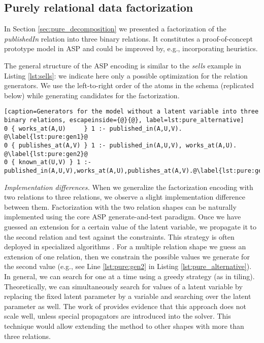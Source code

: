 \subsection{Purely relational data factorization}
In Section \ref{sec:pure_decomposition} we presented a factorization of the \emph{publishedIn} relation into three binary relations. It constitutes a proof-of-concept prototype model in ASP and could be improved by, e.g., incorporating heuristics. %

The general structure of the ASP encoding is similar to the \emph{sells} example in Listing \ref{lst:sells}: we indicate here only a possible optimization for the relation generators.  We use the left-to-right order of the atoms in the schema (replicated below) while generating candidates for the factorization.

\begin{lstlisting}[caption=Generators for the model without a latent variable into three binary relations, escapeinside={@}{@}, label=lst:pure_alternative] 
0 { works_at(A,U)     } 1 :- published_in(A,U,V). @\label{lst:pure:gen1}@
0 { publishes_at(A,V) } 1 :- published_in(A,U,V), works_at(A,U). @\label{lst:pure:gen2}@
0 { known_at(U,V) } 1 :- published_in(A,U,V),works_at(A,U),publishes_at(A,V).@\label{lst:pure:gen3}@
\end{lstlisting}


\textit{Implementation differences.} When we generalize the factorization encoding with two relations to three relations, we observe a slight implementation difference between them. Factorization with the two relation shapes can be naturally implemented using the core ASP generate-and-test paradigm. Once we have guessed an extension for a certain value of the latent variable, we propagate it to the second relation and test against the constraints. This strategy is often deployed in specialized algorithms \parencite{tiling, dbp}.
For a multiple relation shape we guess an extension of one relation, then we constrain the possible values we generate for the second value (e.g., see Line \ref{lst:pure:gen2} in Listing \ref{lst:pure_alternative}). In general, we can search for one at a time using a greedy strategy (as in tiling). Theoretically, we can simultaneously search for values of a latent variable by replacing the fixed latent parameter by a variable and searching over the latent parameter as well. The work of \cite{tias_topk} provides evidence that this approach does not scale well, unless special propagators are introduced into the solver. This technique would allow extending the method to other shapes with more than three relations.
